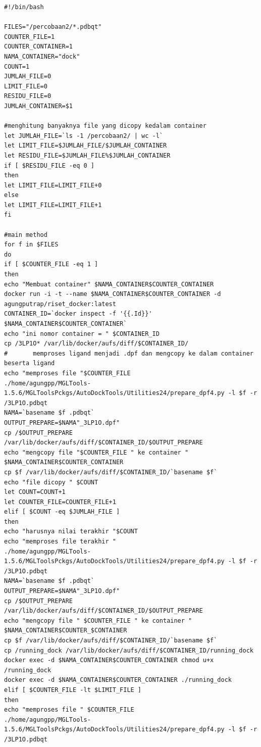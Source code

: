 \begin{lstlisting}[caption=\textit{Script} yang digunakan pada \textit{desktop} PC untuk membuat container dan menjalankan container]
#!/bin/bash

FILES="/percobaan2/*.pdbqt"
COUNTER_FILE=1
COUNTER_CONTAINER=1
NAMA_CONTAINER="dock"
COUNT=1
JUMLAH_FILE=0
LIMIT_FILE=0
RESIDU_FILE=0
JUMLAH_CONTAINER=$1

#menghitung banyaknya file yang dicopy kedalam container
let JUMLAH_FILE=`ls -1 /percobaan2/ | wc -l`
let LIMIT_FILE=$JUMLAH_FILE/$JUMLAH_CONTAINER
let RESIDU_FILE=$JUMLAH_FILE%$JUMLAH_CONTAINER
if [ $RESIDU_FILE -eq 0 ]
then 
let LIMIT_FILE=LIMIT_FILE+0
else
let LIMIT_FILE=LIMIT_FILE+1
fi

#main method
for f in $FILES
do 
if [ $COUNTER_FILE -eq 1 ]
then 
echo "Membuat container" $NAMA_CONTAINER$COUNTER_CONTAINER
docker run -i -t --name $NAMA_CONTAINER$COUNTER_CONTAINER -d agungputrap/riset_docker:latest
CONTAINER_ID=`docker inspect -f '{{.Id}}' $NAMA_CONTAINER$COUNTER_CONTAINER`
echo "ini nomor container = " $CONTAINER_ID
cp /3LP1O* /var/lib/docker/aufs/diff/$CONTAINER_ID/
#		memproses ligand menjadi .dpf dan mengcopy ke dalam container beserta ligand
echo "memproses file "$COUNTER_FILE
./home/agungpp/MGLTools-1.5.6/MGLToolsPckgs/AutoDockTools/Utilities24/prepare_dpf4.py -l $f -r /3LP1O.pdbqt 
NAMA=`basename $f .pdbqt`
OUTPUT_PREPARE=$NAMA"_3LP1O.dpf"
cp /$OUTPUT_PREPARE /var/lib/docker/aufs/diff/$CONTAINER_ID/$OUTPUT_PREPARE
echo "mengcopy file "$COUNTER_FILE " ke container " $NAMA_CONTAINER$COUNTER_CONTAINER
cp $f /var/lib/docker/aufs/diff/$CONTAINER_ID/`basename $f`
echo "file dicopy " $COUNT
let COUNT=COUNT+1
let COUNTER_FILE=COUNTER_FILE+1
elif [ $COUNT -eq $JUMLAH_FILE ]
then 
echo "harusnya nilai terakhir "$COUNT
echo "memproses file terakhir "
./home/agungpp/MGLTools-1.5.6/MGLToolsPckgs/AutoDockTools/Utilities24/prepare_dpf4.py -l $f -r /3LP1O.pdbqt
NAMA=`basename $f .pdbqt`
OUTPUT_PREPARE=$NAMA"_3LP1O.dpf"
cp /$OUTPUT_PREPARE /var/lib/docker/aufs/diff/$CONTAINER_ID/$OUTPUT_PREPARE
echo "mengcopy file " $COUNTER_FILE " ke container " $NAMA_CONTAINER$COUNTER_$CONTAINER
cp $f /var/lib/docker/aufs/diff/$CONTAINER_ID/`basename $f`
cp /running_dock /var/lib/docker/aufs/diff/$CONTAINER_ID/running_dock
docker exec -d $NAMA_CONTAINER$COUNTER_CONTAINER chmod u+x /running_dock
docker exec -d $NAMA_CONTAINER$COUNTER_CONTAINER ./running_dock
elif [ $COUNTER_FILE -lt $LIMIT_FILE ]
then 
echo "memproses file " $COUNTER_FILE
./home/agungpp/MGLTools-1.5.6/MGLToolsPckgs/AutoDockTools/Utilities24/prepare_dpf4.py -l $f -r /3LP1O.pdbqt

\end{lstlisting}
